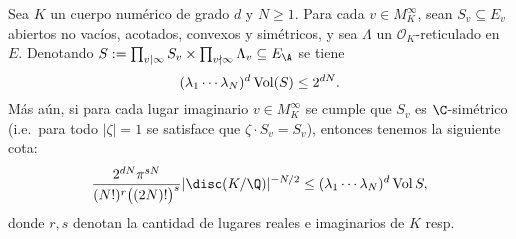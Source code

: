 \documentclass[teoria-numeros.tex]{subfiles}
\begin{document}
\begin{thm}
	Sea $K$ un cuerpo numérico de grado $d$ y $N \ge 1$.
	Para cada $v \in M_K^\infty$, sean $S_v \subseteq E_v$ abiertos no vacíos, acotados, convexos y simétricos,
	y sea $\Lambda$ un $\mathcal{O}_K$-reticulado en $E$.
	Denotando $S := \prod_{v\mid\infty} S_v \times \prod_{v\nmid\infty} \Lambda_v \subseteq E_\A$ se tiene
	$$ (\lambda_1 \cdots \lambda_N)^d \operatorname{Vol}(S) \le 2^{dN}. $$
	Más aún, si para cada lugar imaginario $v \in M_K^\infty$ se cumple que $S_v$ es $\C$-simétrico (i.e.\ para todo $|\zeta| = 1$
	se satisface que $\zeta\cdot S_v = S_v$), entonces tenemos la siguiente cota:
	\begin{equation}
		\frac{2^{dN} \pi^{sN}}{(N!)^r \big( (2N)! \big)^s} |\disc(K/\Q)|^{-N/2} \le ( \lambda_1 \cdots \lambda_N )^d \Vol S,
		\label{eqn:strong_minkowski}
	\end{equation}
	donde $r, s$ denotan la cantidad de lugares reales e imaginarios de $K$ resp.
\end{thm}
\end{document}
